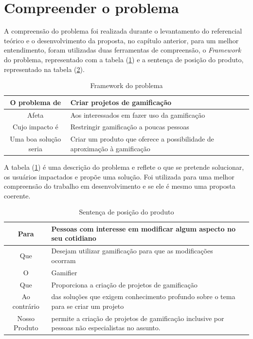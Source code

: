 \newpage

\section {Compreender o problema}

A compreensão do problema foi realizada durante o levantamento do referencial teórico e o desenvolvimento da proposta, no capítulo anterior, para um melhor entendimento, foram utilizadas duas ferramentas de compreensão, o \textit{Framework} do problema, representado com a tabela (\ref{tab02}) e a sentença de posição do produto, representado na tabela (\ref{tab03}).


\begin{table}[!htpb]
\centering
\begin{tabular}{|c|p{6cm}|p{12cm}|} \hline

 O problema de & Criar projetos de gamificação\\ \hline

 Afeta & Aos interessados em fazer uso da gamificação \\ \hline

 Cujo impacto é & Restringir gamificação a poucas pessoas \\ \hline

 Uma boa solução seria & Criar um produto que oferece a possibilidade de aproximação à gamificação \\ \hline

\end{tabular}
\caption{Framework do problema\label{tab02}
}
\end{table} 


A tabela (\ref{tab02}) é uma descrição do problema e reflete o que se pretende solucionar, os usuários impactados e propõe uma solução. Foi utilizada para uma melhor compreensão do trabalho em desenvolvimento e se ele é mesmo uma proposta coerente.

\begin{table}[!htpb]
\centering
\begin{tabular}{|c|p{6cm}|p{15cm}|} \hline

 Para  & Pessoas com interesse em modificar algum aspecto no seu cotidiano \\ \hline

 Que & Desejam utilizar gamificação para que as modificações ocorram \\ \hline

 O  & Gamifier \\ \hline

 Que & Proporciona a criação de projetos de gamificação \\ \hline

 Ao contrário  & das soluções que exigem conhecimento profundo sobre o tema para se criar um projeto \\ \hline

 Nosso Produto & permite a criação de projetos de gamificação inclusive por pessoas não especialistas no assunto. \\ \hline

\end{tabular}
\caption{Sentença de posição do produto\label{tab03}
}
\end{table} 


